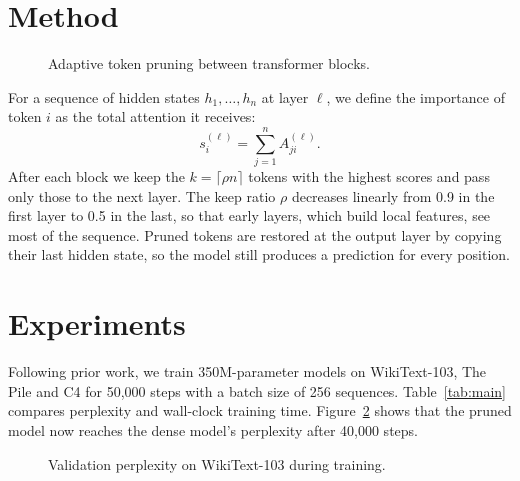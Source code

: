 \documentclass[11pt]{article}
\begin{document}
\section{Method}
\begin{figure}[t]
\centering
{}
\caption{Adaptive token pruning between transformer blocks.}
\label{fig:arch}
\end{figure}
For a sequence of hidden states $h_1, \dots, h_n$ at layer $\ell$, we define the importance of token $i$
as the total attention it receives:
\begin{equation}
  s_i^{(\ell)} = \sum_{j=1}^{n} A^{(\ell)}_{ji}.
\end{equation}
After each block we keep the $k = \lceil \rho n \rceil$ tokens with the highest scores and pass only those
to the next layer. The keep ratio $\rho$ decreases linearly from 0.9 in the first layer to 0.5 in the last, so that early layers, which build local features, see most of the sequence. Pruned tokens are restored at the
output layer by copying their last hidden state, so the model still produces a prediction for every position.

\section{Experiments}
Following prior work, we train 350M-parameter models on WikiText-103, The Pile and C4 for 50{,}000 steps with a batch size of
256 sequences. Table~\ref{tab:main} compares perplexity and wall-clock training time. Figure~\ref{fig:curve} shows that the pruned model now reaches the dense model's perplexity after 40{,}000 steps.

\begin{figure}[t]
\centering
{}
\caption{Validation perplexity on WikiText-103 during training.}
\label{fig:curve}
\end{figure}
\end{document}
